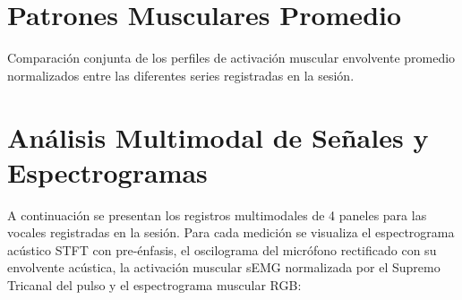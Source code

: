 \documentclass[11pt,a4paper]{article}
\begin{document}
\newpage
\section{Patrones Musculares Promedio}
Comparación conjunta de los perfiles de activación muscular envolvente promedio normalizados entre las diferentes series registradas en la sesión.

\newpage
\section{Análisis Multimodal de Señales y Espectrogramas}
A continuación se presentan los registros multimodales de 4 paneles para las vocales registradas en la sesión. Para cada medición se visualiza el espectrograma acústico STFT con pre-énfasis, el oscilograma del micrófono rectificado con su envolvente acústica, la activación muscular sEMG normalizada por el Supremo Tricanal del pulso y el espectrograma muscular RGB:
\end{document}

